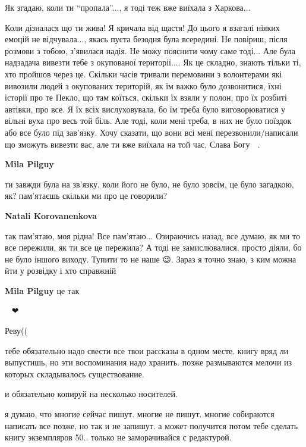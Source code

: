 
Як згадаю, коли ти \enquote{пропала}..., я тоді теж вже виїхала з Харкова...

Коли дізналася що ти жива! Я кричала від щастя! До цього я взагалі ніяких
емоцій не відчувала..., якась пуста безодня була всередині. Не повіриш, після
розмови з тобою, з'явилася надія. Не можу пояснити чому саме тоді... Але була
надзадача вивезти тебе з окупованої території.... Як це складно, знають тільки
ті, хто пройшов через це. Скільки часів тривали перемовини з волонтерами які
вивозили людей з окупованих територій, як їм важко було дозвонитися, їхні
історії про те Пекло, що там коїться, скільки їх взяли у полон, про їх розбиті
автівки, про все. Я їх всіх вислуховувала, бо їм треба було виговорюватися у
вільні вуха про весь той біль. Але тоді, коли мені треба, в них не було поїздок
або все було під зав'язку. Хочу сказати, що вони всі мені перезвонили/написали
що зможуть вивезти вас, але ти вже виїхала на той час, Слава Богу 🙏 .

\begin{itemize} %
\textbf{Mila Pilguy} 

ти завжди була на зв'язку, коли його не було, не було зовсім, це було загадкою,
як?🤔пам'ятаєшь скільки ми про це говорили?🥰

\textbf{Natali Korovanenkova} 

так пам'ятаю, моя рідна! Все пам'ятаю... Озираючись назад, все думаю, як ми то
все пережили, як ти все це пережила? А тоді не замислювалися, просто діяли, бо
не було іншого виходу. Тупити то не наше 😉. Зараз я точно знаю, з ким можна
йти у розвідку і хто справжній 💪💛💙

\textbf{Mila Pilguy} це так

\end{itemize} %

🙏🙏🙏❤🐾🐾


Реву((



тебе обязательно надо свести все твои рассказы в одном месте. книгу вряд ли
выпустишь, но эти воспоминания надо хранить. позже размываются мелочи из
которых складывалось существование.

и обязательно копируй на несколько носителей.

я думаю, что многие сейчас пишут. многие не пишут. многие собираются написать
все позже, но так и не запишут. а может получится потом тебе сделать книгу
экземпляров 50.. только не заморачивайся с редактурой.

